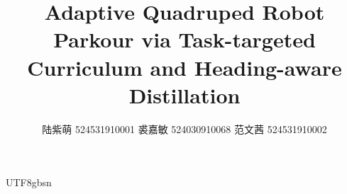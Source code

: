 \documentclass[conference]{IEEEtran}
\begin{document}
\begin{CJK}{UTF8}{gbsn}

\title{ Adaptive Quadruped Robot Parkour via Task-targeted Curriculum and Heading-aware Distillation}

\author{陆紫萌 524531910001    
裘嘉敏 524030910068    
范文茜 524531910002}





% 



\end{CJK}
\end{document}
